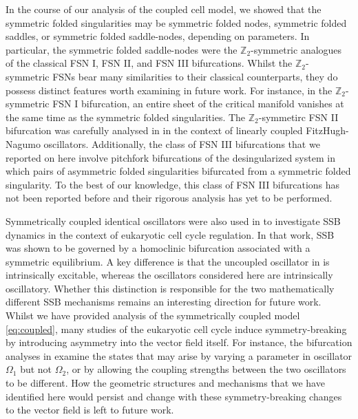 \documentclass[10pt,onecolumn]{article}
\theoremstyle{plain}
\begin{document}
In the course of our analysis of the coupled cell model, we showed that the symmetric folded singularities may be symmetric folded nodes, symmetric folded saddles, or symmetric folded saddle-nodes, depending on parameters. 
In particular, the symmetric folded saddle-nodes were the $\mathbb Z_2$-symmetric analogues of the classical FSN I, FSN II, and FSN III bifurcations. 
Whilst the $\mathbb Z_2$-symmetric FSNs bear many similarities to their classical counterparts, they do possess distinct features worth examining in future work. 
For instance, in the $\mathbb Z_2$-symmetric FSN I bifurcation, an entire sheet of the critical manifold vanishes at the same time as the symmetric folded singularities. 
The $\mathbb Z_2$-symmetirc FSN II bifurcation was carefully analysed in \cite{Kristiansen2023} in the context of linearly coupled FitzHugh-Nagumo oscillators. 
Additionally, the class of FSN III bifurcations that we reported on here involve pitchfork bifurcations of the desingularized system in which pairs of asymmetric folded singularities bifurcated from a symmetric folded singularity. To the best of our knowledge, this class of FSN III bifurcations has not been reported before and their rigorous analysis has yet to be performed. 


Symmetrically coupled identical oscillators were also used in \cite{gandhi2025conceptual} to investigate SSB dynamics in the context of eukaryotic cell cycle regulation. In that work, SSB was shown to be governed by a homoclinic bifurcation associated with a symmetric equilibrium. A key difference is that the uncoupled oscillator in \cite{gandhi2025conceptual} is intrinsically excitable, whereas the oscillators considered here are intrinsically oscillatory. Whether this distinction is responsible for the two mathematically different SSB mechanisms remains an interesting direction for future work. Whilst we have provided analysis of the symmetrically coupled model \eqref{eq:coupled}, many studies of the eukaryotic cell cycle induce symmetry-breaking by introducing asymmetry into the vector field itself. For instance, the bifurcation analyses in \cite{Dragoi2024} examine the states that may arise by varying a parameter in oscillator $\Omega_1$ but not $\Omega_2$, or by allowing the coupling strengths between the two oscillators to be different. How the geometric structures and mechanisms that we have identified here would persist and change with these symmetry-breaking changes to the vector field is left to future work. 
\end{document}
